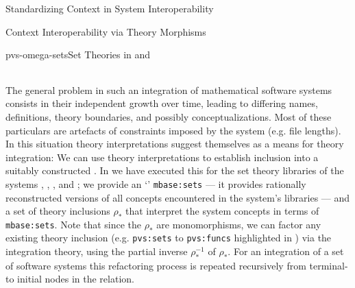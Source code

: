 \begin{omgroup}[id=logics,creators=miko]{Standardizing Context in System Interoperability}
\begin{omgroup}[id=logics.integrating-libraries]{Context Interoperability via Theory  Morphisms}
\begin{myfig}{pvs-omega-sets}{Set Theories in {\OMEGA} and {\pvs}}
\begin{tabular}{|>{\tt}l|>{\tt}l|||>{\tt}l|>{\tt}l|}
  \end{tabular}
\end{myfig}
The general problem in such an integration of mathematical software systems consists in
their independent growth over time, leading to differing names, definitions, theory
boundaries, and possibly conceptualizations. Most of these particulars are artefacts of
constraints imposed by the system (e.g. file lengths). In this situation theory
interpretations suggest themselves as a means for theory integration: We can use theory
interpretations to establish inclusion into a suitably constructed
{}. In {} we have executed this
for the set theory libraries of the systems {\pvs}, {\OMEGA}, {\tps}, and {\imps}; we
provide an `{}' {\tt{mbase:sets}} --- it provides rationally
reconstructed versions of all concepts encountered in the system's libraries --- and a set
of theory inclusions $\rho_*$ that interpret the system concepts in terms of
{\tt{mbase:sets}}. Note that since the $\rho_*$ are monomorphisms, we can factor any
existing theory inclusion (e.g. {\tt{pvs:sets}} to {\tt{pvs:funcs}} highlighted in
{}) via the integration theory, using the partial inverse
$\rho_*^{-1}$ of $\rho_*$. For an integration of a set of software systems this
refactoring process is repeated recursively from terminal- to initial nodes in the
{} relation.


\end{omgroup}
\end{omgroup}
